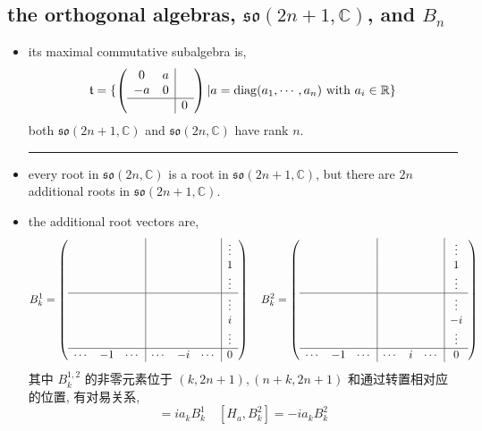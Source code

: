 \subsection{the orthogonal algebras, \texorpdfstring{$\mathfrak{so}(2 n + 1, \mathbb{C})$}{so(2 n + 1, C)}, and \texorpdfstring{$B_n$}{B\_n}}
\begin{itemize}
	\item its maximal commutative subalgebra is,
	\begin{equation}
		\mathfrak{t} = \{\left( \begin{array}{cc|c}
			0 & a & \\
			- a & 0 & \\
			\hline
			& & 0
		\end{array} \right) | a = \mathrm{diag}(a_1, \cdots, a_n) \ \text{with} \ a_i \in \mathbb{R}\}
	\end{equation}
	both $\mathfrak{so}(2 n + 1, \mathbb{C})$ and $\mathfrak{so}(2 n, \mathbb{C})$ have rank $n$.
	
	\noindent\rule[0.5ex]{\linewidth}{0.5pt} %
	
	\item every root in $\mathfrak{so}(2 n, \mathbb{C})$ is a root in $\mathfrak{so}(2 n + 1, \mathbb{C})$, but there are $2 n$ additional roots in $\mathfrak{so}(2 n + 1, \mathbb{C})$.
	
	\item the additional root vectors are,
	\begin{equation}
		B^1_k = \left( \begin{array}{ccc|ccc|c}
			& & & & & & \vdots \\
			& & & & & & 1 \\
			& & & & & & \vdots \\
			\hline
			& & & & & & \vdots \\
			& & & & & & i \\
			& & & & & & \vdots \\
			\hline
			\cdots & - 1 & \cdots & \cdots & - i & \cdots & 0
		\end{array} \right) \quad B^2_k = \left( \begin{array}{ccc|ccc|c}
			& & & & & & \vdots \\
			& & & & & & 1 \\
			& & & & & & \vdots \\
			\hline
			& & & & & & \vdots \\
			& & & & & & - i \\
			& & & & & & \vdots \\
			\hline
			\cdots & - 1 & \cdots & \cdots & i & \cdots & 0
		\end{array} \right)
	\end{equation}
	其中 $B^{1, 2}_k$ 的非零元素位于 $(k, 2 n + 1), (n + k, 2 n + 1)$ 和通过转置相对应的位置, 有对易关系,
	\begin{equation}
		[H_a, B^1_k] = i a_k B^1_k \quad [H_a, B^2_k] = - i a_k B^2_k
	\end{equation}
	

\end{itemize}
